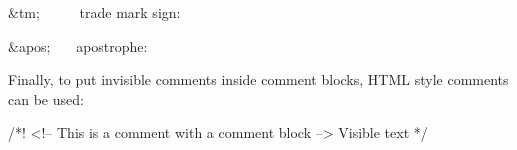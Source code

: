 \begin{DoxyItemize}
\item {\ttfamily \&tm;}{\ttfamily ~~~~~} trade mark sign\+: \texttrademark{} 
\item {\ttfamily \&apos;}{\ttfamily ~~~} apostrophe\+: \textquotesingle{} 
\end{DoxyItemize}

Finally, to put invisible comments inside comment blocks, H\+T\+ML style comments can be used\+: \begin{DoxyVerb}/*! <!-- This is a comment with a comment block --> Visible text */
\end{DoxyVerb}


 